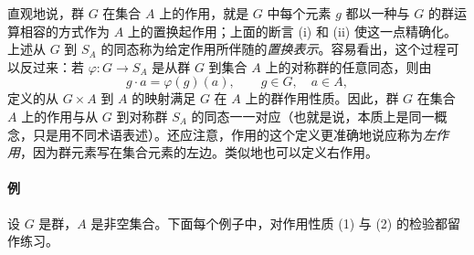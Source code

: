 直观地说，群 $G$ 在集合 $A$ 上的作用，就是 $G$ 中每个元素 $g$ 都以一种与 $G$ 的群运算相容的方式作为 $A$ 上的置换起作用；上面的断言 (i) 和 (ii) 使这一点精确化。上述从 $G$ 到 $S_A$ 的同态称为给定作用所伴随的\emph{置换表示}。容易看出，这个过程可以反过来：若 $\varphi:G\to S_A$ 是从群 $G$ 到集合 $A$ 上的对称群的任意同态，则由
\[
  g\cdot a=\varphi(g)(a),\qquad g\in G,
  \quad a\in A,
\]
定义的从 $G\times A$ 到 $A$ 的映射满足 $G$ 在 $A$ 上的群作用性质。因此，群 $G$ 在集合 $A$ 上的作用与从 $G$ 到对称群 $S_A$ 的同态一一对应（也就是说，本质上是同一概念，只是用不同术语表述）。还应注意，作用的这个定义更准确地说应称为\emph{左作用}，因为群元素写在集合元素的左边。类似地也可以定义右作用。

\paragraph{例}
设 $G$ 是群，$A$ 是非空集合。下面每个例子中，对作用性质 (1) 与 (2) 的检验都留作练习。

